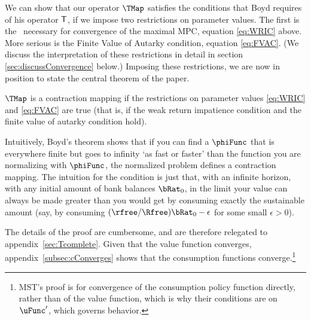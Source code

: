 \documentclass[BufferStockTheory]{subfiles}
\begin{document}
\begin{comment}
  Unpacking the definitions, our mapping $\TMap$ can be written more explicitly as
  \begin{align}
    \{\TMap\zFunc\}(\mRat_{t})  & = \underset{\cRat_{t} \in [\MinMinMPC
                                  \mRat_{t}, \MaxMPC \mRat_{t}]} \max \left\{
                                  \uFunc(c_{t})+\DiscFac \Ex_{t}\left[ {\PGro}_{t+1} ^{1-\CRRA }\zFunc(
                                  {\aRat}_{t}\Rnorm_{t+1}+\tShkAll_{t+1}) \right] \right\}
                                  .
  \end{align}
\end{comment}

\hypertarget{Contraction-Conditions}{}

We can show that our operator $\TMap$ satisfies the conditions that
Boyd requires of his operator $\mathsf{T}$, if we impose two restrictions
on parameter values.  The first is the \WRIC~necessary for
convergence of the maximal MPC, equation \eqref{eq:WRIC} above.  More serious is the Finite Value of
Autarky condition, equation \eqref{eq:FVAC}.  (We discuss the
interpretation of these restrictions in detail in section
\ref{sec:discussConvergence} below.)  Imposing these restrictions, we
are now in position to state the central theorem of the paper.

\hypertarget{MainTheorem}{}
\setcounter{theorem}{0}
\begin{theorem}
  \label{thm:contmap} $\TMap$ is a contraction mapping if
  the restrictions on parameter values \eqref{eq:WRIC} and
  \eqref{eq:FVAC} are true (that is, if the weak return impatience condition and the finite value of autarky condition hold).
\end{theorem}

Intuitively, Boyd's theorem shows that if you can find a $\phiFunc$ that is everywhere finite but goes to infinity `as fast or faster' than the function you are normalizing with $\phiFunc$, the normalized problem defines a contraction mapping.  The intuition for the {\FVAC} condition is just that, with an infinite horizon, with any initial amount of bank balances $\bRat_{0}$, in the limit your value can always be made greater than you would get by consuming exactly the sustainable amount (say, by consuming $(\rfree/\Rfree)\bRat_{0}-\epsilon$ for some small $\epsilon>0$).

The details of the proof are cumbersome, and are therefore relegated to
appendix~\ref{sec:Tcomplete}.  Given that the value function
converges, appendix~\ref{subsec:cConverges} shows that the consumption
functions converge.\footnote{MST's proof is for convergence of the consumption policy function directly, rather than of the value function, which is why their conditions are on $\uFunc^{\prime}$, which governs behavior.}
\end{document}
